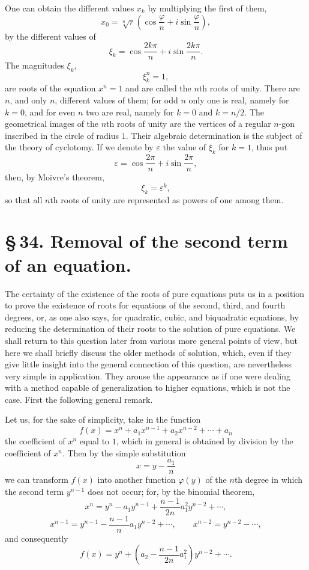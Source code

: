 \documentclass[11pt]{article}
\begin{document}
One can obtain the different values $x_k$ by multiplying the first of them,
\[
 x_0=\sqrt[n]{r}\left(\cos\frac{\varphi}{n}+i\sin\frac{\varphi}{n}\right),
\]
by the different values of
\begin{equation}
 \xi_k=\cos\frac{2k\pi}{n}+i\sin\frac{2k\pi}{n}.
\tag{11}
\end{equation}
The magnitudes $\xi_k$,
\begin{equation}
 \xi_k^n=1,
\tag{12}
\end{equation}
are roots of the equation $x^n=1$ and are called the $n$th roots of unity. There are $n$, and only $n$, different values of them; for odd $n$ only one is real, namely for $k=0$, and for even $n$ two are real, namely for $k=0$ and $k=n/2$. The geometrical images of the $n$th roots of unity are the vertices of a regular $n$-gon inscribed in the circle of radius $1$. Their algebraic determination is the subject of the theory of cyclotomy. If we denote by $\varepsilon$ the value of $\xi_k$ for $k=1$, thus put
\[
 \varepsilon=\cos\frac{2\pi}{n}+i\sin\frac{2\pi}{n},
\]
then, by Moivre's theorem,
\[
 \xi_k=\varepsilon^k,
\]
so that all $n$th roots of unity are represented as powers of one among them.


\section*{\S\,34. Removal of the second term of an equation.}

The certainty of the existence of the roots of pure equations puts us in a position to prove the existence of roots for equations of the second, third, and fourth degrees, or, as one also says, for quadratic, cubic, and biquadratic equations, by reducing the determination of their roots to the solution of pure equations. We shall return to this question later from various more general points of view, but here we shall briefly discuss the older methods of solution, which, even if they give little insight into the general connection of this question, are nevertheless very simple in application. They arouse the appearance as if one were dealing with a method capable of generalization to higher equations, which is not the case. First the following general remark.

Let us, for the sake of simplicity, take in the function
\begin{equation}
f(x)=x^n+a_1x^{n-1}+a_2x^{n-2}+\cdots+a_n
\tag{1}
\end{equation}
the coefficient of $x^n$ equal to $1$, which in general is obtained by division by the coefficient of $x^n$. Then by the simple substitution
\begin{equation}
x=y-\frac{a_1}{n}
\tag{2}
\end{equation}
we can transform $f(x)$ into another function $\varphi(y)$ of the $n$th degree in which the second term $y^{n-1}$ does not occur; for, by the binomial theorem,
\[
 x^n=y^n-a_1y^{n-1}+\frac{n-1}{2n}a_1^2y^{n-2}+\cdots,
\]
\[
 x^{n-1}=y^{n-1}-\frac{n-1}{n}a_1y^{n-2}+\cdots,
 \qquad x^{n-2}=y^{n-2}-\cdots,
\]
and consequently
\[
 f(x)=y^n+\left(a_2-\frac{n-1}{2n}a_1^2\right)y^{n-2}+\cdots .
\]
\end{document}
